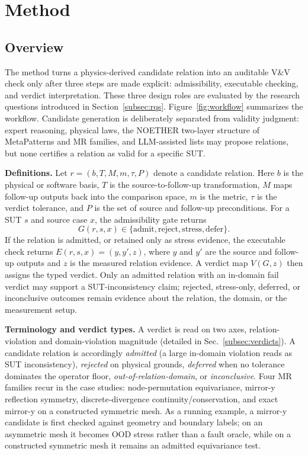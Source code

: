 \documentclass[preprint,12pt,authoryear]{elsarticle}
\begin{document}
\section{Method}
\label{sec:method}

\subsection{Overview}
\label{subsec:method-overview}

The method turns a physics-derived candidate relation into an auditable V\&V check only after three steps are made explicit: admissibility, executable checking, and verdict interpretation. These three design roles are evaluated by the research questions introduced in Section~\ref{subsec:rqs}. Figure~\ref{fig:workflow} summarizes the workflow. Candidate generation is deliberately separated from validity judgment: expert reasoning, physical laws, the NOETHER two-layer structure of MetaPatterns and MR families, and LLM-assisted lists may propose relations, but none certifies a relation as valid for a specific SUT.

\textbf{Definitions.} Let \(r=(b,T,M,m,\tau,P)\) denote a candidate relation. Here \(b\) is the physical or software basis, \(T\) is the source-to-follow-up transformation, \(M\) maps follow-up outputs back into the comparison space, \(m\) is the metric, \(\tau\) is the verdict tolerance, and \(P\) is the set of source and follow-up preconditions. For a SUT \(s\) and source case \(x\), the admissibility gate returns
\[
G(r,s,x)\in\{\mathrm{admit},\mathrm{reject},\mathrm{stress},\mathrm{defer}\}.
\]
If the relation is admitted, or retained only as stress evidence, the executable check returns \(E(r,s,x)=(y,y',z)\), where \(y\) and \(y'\) are the source and follow-up outputs and \(z\) is the measured relation evidence. A verdict map \(V(G,z)\) then assigns the typed verdict. Only an admitted relation with an in-domain fail verdict may support a SUT-inconsistency claim; rejected, stress-only, deferred, or inconclusive outcomes remain evidence about the relation, the domain, or the measurement setup.

\textbf{Terminology and verdict types.} A verdict is read on two axes, relation-violation and domain-violation magnitude (detailed in Sec.~\ref{subsec:verdicts}). A candidate relation is accordingly \emph{admitted} (a large in-domain violation reads as SUT inconsistency), \emph{rejected} on physical grounds, \emph{deferred} when no tolerance dominates the operator floor, \emph{out-of-relation-domain}, or \emph{inconclusive}. Four MR families recur in the case studies: node-permutation equivariance, mirror-y reflection symmetry, discrete-divergence continuity/conservation, and exact mirror-y on a constructed symmetric mesh. As a running example, a mirror-y candidate is first checked against geometry and boundary labels; on an asymmetric mesh it becomes OOD stress rather than a fault oracle, while on a constructed symmetric mesh it remains an admitted equivariance test.
\end{document}
